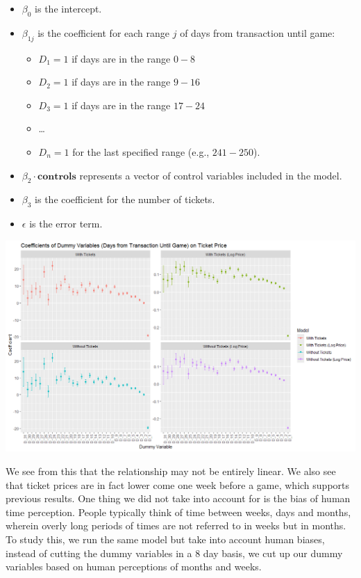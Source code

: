 \documentclass[
  12pt]{article}
\providecommand{\tightlist}{%
  \setlength{\itemsep}{0pt}\setlength{\parskip}{0pt}}\usepackage{longtable,booktabs,array}
\begin{document}
\begin{itemize}
\tightlist
\item
  \(\beta_0\) is the intercept.
\item
  \(\beta_{1j}\) is the coefficient for each range \(j\) of days from
  transaction until game:

  \begin{itemize}
  \tightlist
  \item
    \(D_1 = 1\) if days are in the range \(0-8\)
  \item
    \(D_2 = 1\) if days are in the range \(9-16\)
  \item
    \(D_3 = 1\) if days are in the range \(17-24\)
  \item
    \ldots{}
  \item
    \(D_n = 1\) for the last specified range (e.g., \(241-250\)).
  \end{itemize}
\item
  \(\beta_2 \cdot \mathbf{\text{controls}}\) represents a vector of
  control variables included in the model.
\item
  \(\beta_3\) is the coefficient for the number of tickets.
\item
  \(\epsilon\) is the error term.
\end{itemize}

\includegraphics{images/12.png}

We see from this that the relationship may not be entirely linear. We
also see that ticket prices are in fact lower come one week before a
game, which supports previous results. One thing we did not take into
account for is the bias of human time perception. People typically think
of time between weeks, days and months, wherein overly long periods of
times are not referred to in weeks but in months. To study this, we run
the same model but take into account human biases, instead of cutting
the dummy variables in a 8 day basis, we cut up our dummy variables
based on human perceptions of months and weeks.
\end{document}
